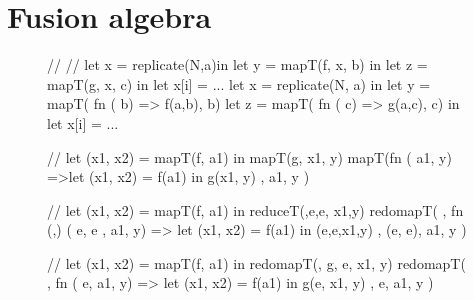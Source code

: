 \section{Fusion algebra}
\label{sec:fusionalgebra}


\begin{figure}[bt]
\begin{colorcode}
// 
// 
let x = replicate(N,a)in 
let y = mapT(f, x, b) in
let z = mapT(g, x, c) in 
let x[i] = ...
    \emphh{\mymath{\equiv}}
let x = replicate(N, a) in 
let y = mapT( fn  ( b) 
              => f(a,b), b)
let z = mapT( fn  ( c) 
              => g(a,c), c)
in let x[i] = ...   


//  
let (x1, x2) = mapT(f, a1)
in  mapT(g, x1, y)   
    \emphh{\mymath{\equiv}}
mapT(fn \mymath{\beta} ( a1,  y)
  =>let (x1, x2) = f(a1)
    in  g(x1, y)
, a1, y )


//
let (x1, x2) = mapT(f, a1)
in  reduceT(\mymath{\oplus},e,e, x1,y)   
    \emphh{\mymath{\equiv}}
redomapT(\mymath{\oplus}
, fn (,) (  e,  e
             ,  a1, y)
   => let (x1, x2) = f(a1)
      in  \mymath{\oplus}(e,e,x1,y)
, (e, e), a1, y )


//
let (x1, x2) = mapT(f, a1)
in  redomapT(\mymath{\oplus}, g, e, x1, y)
    \emphh{\mymath{\equiv}}
redomapT(\mymath{\oplus}
, fn \mymath{\beta} (\mymath{\beta} e,  a1,  y)
   => let (x1, x2) = f(a1)
      in  g(e, x1, y)
, e, a1, y )


\end{colorcode}
\end{figure}
